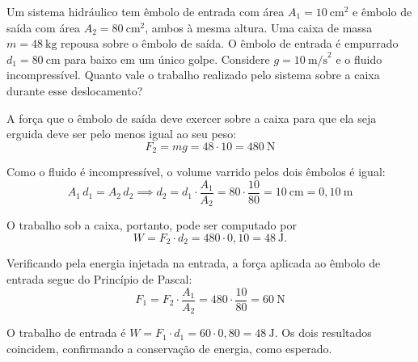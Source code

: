 \vspace{0.3cm}






\begin{exemplo}[Nível II]\label{exemplo_fluidos_pascalex02}

Um sistema hidráulico tem êmbolo de entrada com área $A_1 = 10\ \text{cm}^2$
e êmbolo de saída com área $A_2 = 80\ \text{cm}^2$, ambos à mesma altura.
Uma caixa de massa $m = 48\ \text{kg}$ repousa sobre o êmbolo de saída.
O êmbolo de entrada é empurrado $d_1 = 80\ \text{cm}$ para baixo em um
único golpe. Considere $g = 10\ \text{m/s}^2$ e o fluido incompressível.
Quanto vale o trabalho realizado pelo sistema sobre a caixa durante esse deslocamento?


\resolucao


A força que o êmbolo de saída deve exercer sobre a caixa para que ela seja erguida deve ser pelo menos igual ao  seu peso:
\begin{equation}
    F_2 = mg = 48 \cdot 10 = 480\ \text{N} \nonumber 
\end{equation}


Como o fluido é incompressível, o volume varrido pelos dois êmbolos é
igual:
\begin{equation}
    A_1\, d_1 = A_2\, d_2 \nonumber 
    \implies
    d_2 = d_1 \cdot \frac{A_1}{A_2}
        = 80 \cdot \frac{10}{80}
        = 10\ \text{cm}
        = 0{,}10\ \text{m}
\end{equation}

O trabalho sob a caixa, portanto, pode ser computado por
\begin{equation}
    W = F_2 \cdot d_2 = 480 \cdot 0{,}10 = 48\ \text{J}. \nonumber 
\end{equation}

Verificando pela energia injetada na entrada, a força aplicada ao êmbolo de entrada segue do Princípio de Pascal:
\begin{equation}
    F_1 = F_2 \cdot \frac{A_1}{A_2} = 480 \cdot \frac{10}{80} = 60\ \text{N} \nonumber 
\end{equation}

O trabalho de entrada é $W = F_1 \cdot d_1 = 60 \cdot 0{,}80 = 48\ \text{J}$. Os dois resultados coincidem, confirmando a conservação de energia, como esperado.

\end{exemplo}



\vspace{0.3cm}







